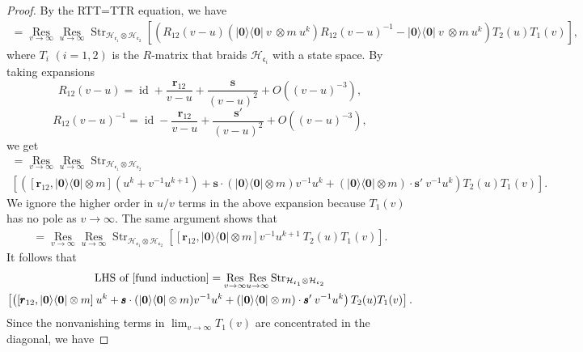\documentclass[10pt]{amsart}
\theoremstyle{definition}
\numberwithin{equation}{section}
\newcommand{\cH}{\mathcal{H}}
\newcommand{\Res}{\operatorname{Res}}
\newcommand{\str}{\operatorname{Str}}
\newcommand{\id}{\operatorname{id}}
\begin{document}
\begin{proof}
By the RTT=TTR equation, we have
\begin{align*}
[\mathsf E(|\mathbf 0\rangle\langle\mathbf 0|\: v),\mathsf E(m\: u^{k})]=\underset{v\to \infty}{\Res}\underset{u\to \infty}{\Res}\str_{\cH_{\mathfrak{c}_1}\otimes \cH_{\mathfrak{c}_2}}\left[\left(R_{12}(v-u)(|\mathbf 0\rangle\langle\mathbf 0|\: v\:\otimes m\: u^{k})R_{12}(v-u)^{-1}- |\mathbf 0\rangle\langle\mathbf 0|\: v\:\otimes m\: u^{k}\right)T_2(u)T_{1}(v)\right],
\end{align*}
where $T_i$ $(i=1,2)$ is the $R$-matrix that braids $\cH_{\mathfrak{c}_i}$ with a state space. By taking expansions 
$$R_{12}(v-u)=\id+\frac{\pmb r_{12}}{v-u}+\frac{\pmb s}{(v-u)^2}+O((v-u)^{-3}),$$ 
$$R_{12}(v-u)^{-1}=\id-\frac{\pmb r_{12}}{v-u}+\frac{\pmb s'}{(v-u)^2}+O((v-u)^{-3}),$$ 
we get
\begin{multline*}
[\mathsf E(|\mathbf 0\rangle\langle\mathbf 0|\: v),\mathsf E(m\: u^{k})]=\underset{v\to \infty}{\Res}\underset{u\to \infty}{\Res}\str_{\cH_{\mathfrak{c}_1}\otimes \cH_{\mathfrak{c}_2}}\\
\left[\left([\pmb r_{12},|\mathbf 0\rangle\langle\mathbf 0| \otimes m](u^k+v^{-1}u^{k+1})+\pmb s\cdot(|\mathbf 0\rangle\langle\mathbf 0| \otimes m)v^{-1}u^k+(|\mathbf 0\rangle\langle\mathbf 0| \otimes m)\cdot \pmb s'\:v^{-1}u^k\right)T_2(u)T_{1}(v)\right].
\end{multline*}
We ignore the higher order in $u/v$ terms in the above expansion because $T_1(v)$ has no pole as $v\to \infty$. The same argument shows that
\begin{align*}
[\mathsf E(|\mathbf 0\rangle\langle\mathbf 0|\: v),\mathsf E(m\: u^{k})]=\underset{v\to \infty}{\Res}\underset{u\to \infty}{\Res}\str_{\cH_{\mathfrak{c}_1}\otimes \cH_{\mathfrak{c}_2}}
\left[[\pmb r_{12},|\mathbf 0\rangle\langle\mathbf 0| \otimes m]v^{-1}u^{k+1}\:T_2(u)T_{1}(v)\right].
\end{align*}
It follows that
\begin{multline*}
\text{LHS of \eqref{fund induction}}=\underset{v\to \infty}{\Res}\underset{u\to \infty}{\Res}\str_{\cH_{\mathfrak{c}_1}\otimes \cH_{\mathfrak{c}_2}}
\\
\left[\left([\pmb r_{12},|\mathbf 0\rangle\langle\mathbf 0| \otimes m]\:u^{k}+\pmb s\cdot(|\mathbf 0\rangle\langle\mathbf 0| \otimes m)v^{-1}u^k+(|\mathbf 0\rangle\langle\mathbf 0| \otimes m)\cdot \pmb s'\:v^{-1}u^k\right)T_2(u)T_{1}(v)\right].
\end{multline*}
Since the nonvanishing terms in $\lim_{v\to \infty}T_1(v)$ are concentrated in the diagonal, we have 

\end{proof}
\end{document}
